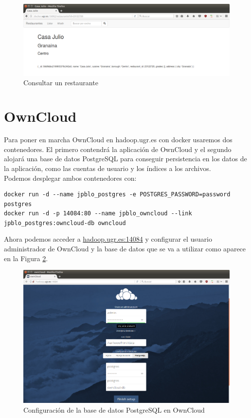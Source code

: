 \begin{figure}[h!]
	\centering
	\includegraphics[width=13cm]{./images/consultar}
	\caption{Consultar un restaurante} 
	\label{fig:consultar}
\end{figure}

\section{OwnCloud}

Para poner en marcha OwnCloud en hadoop.ugr.es con docker usaremos dos contenedores. El primero contendrá la aplicación de OwnCloud y el segundo alojará una base de datos PostgreSQL para conseguir persistencia en los datos de la aplicación, como las cuentas de usuario y los índices a los archivos. \\

Podemos desplegar ambos contenedores con: \\

\begin{lstlisting}
docker run -d --name jpblo_postgres -e POSTGRES_PASSWORD=password postgres
docker run -d -p 14084:80 --name jpblo_owncloud --link jpblo_postgres:owncloud-db owncloud
\end{lstlisting}

Ahora podemos acceder a \url{hadoop.ugr.es:14084} y configurar el usuario administrador de OwnCloud y la base de datos que se va a utilizar como aparece en la Figura \ref{fig:owncloud}. \\

\begin{figure}[h!]
	\centering
	\includegraphics[width=13cm]{./images/owncloud}
	\caption{Configuración de la base de datos PostgreSQL en OwnCloud} 
	\label{fig:owncloud}
\end{figure}


